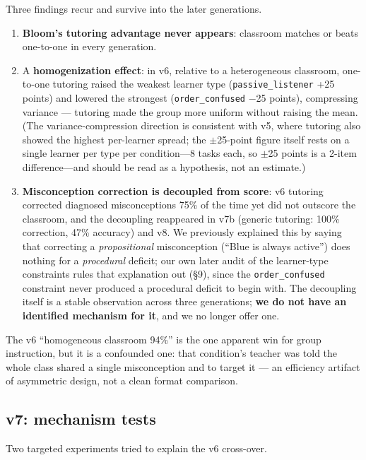 \documentclass[11pt]{article}
\begin{document}
Three findings recur and survive into the later generations.
\begin{enumerate}
  \item[(i)] \textbf{Bloom's tutoring advantage never appears}: classroom matches or
    beats one-to-one in every generation.
  \item[(ii)] A \textbf{homogenization effect}: in v6, relative to a heterogeneous
    classroom, one-to-one tutoring raised the weakest learner type
    (\texttt{passive\_listener} +25 points) and lowered the strongest
    (\texttt{order\_confused} $-$25 points), compressing variance --- tutoring made
    the group more uniform without raising the mean.  (The variance-compression
    direction is consistent with v5, where tutoring also showed the highest
    per-learner spread; the $\pm$25-point figure itself rests on a single learner
    per type per condition---8 tasks each, so $\pm$25 points is a 2-item
    difference---and should be read as a hypothesis, not an estimate.)
  \item[(iii)] \textbf{Misconception correction is decoupled from score}: v6 tutoring
    corrected diagnosed misconceptions 75\% of the time yet did not outscore the
    classroom, and the decoupling reappeared in v7b (generic tutoring: 100\%
    correction, 47\% accuracy) and v8.  We previously explained this by saying that
    correcting a \emph{propositional} misconception (``Blue is always active'') does
    nothing for a \emph{procedural} deficit; our own later audit of the learner-type
    constraints rules that explanation out (\S9), since the \texttt{order\_confused}
    constraint never produced a procedural deficit to begin with.  The decoupling
    itself is a stable observation across three generations; \textbf{we do not have an
    identified mechanism for it}, and we no longer offer one.
\end{enumerate}

The v6 ``homogeneous classroom 94\%'' is the one apparent win for group instruction,
but it is a confounded one: that condition's teacher was told the whole class shared
a single misconception and to target it --- an efficiency artifact of asymmetric
design, not a clean format comparison.

\subsection{v7: mechanism tests}

Two targeted experiments tried to explain the v6 cross-over.
\end{document}
